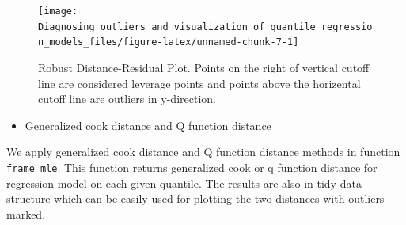 \documentclass[11pt,a4paper,]{article}
\newenvironment{Shaded}{\begin{snugshade}}{\end{snugshade}}
\newcommand{\KeywordTok}[1]{\textcolor[rgb]{0.13,0.29,0.53}{\textbf{{#1}}}}
\newcommand{\DataTypeTok}[1]{\textcolor[rgb]{0.13,0.29,0.53}{{#1}}}
\newcommand{\DecValTok}[1]{\textcolor[rgb]{0.00,0.00,0.81}{{#1}}}
\newcommand{\FloatTok}[1]{\textcolor[rgb]{0.00,0.00,0.81}{{#1}}}
\newcommand{\StringTok}[1]{\textcolor[rgb]{0.31,0.60,0.02}{{#1}}}
\newcommand{\NormalTok}[1]{{#1}}
\providecommand{\tightlist}{%
  \setlength{\itemsep}{0pt}\setlength{\parskip}{0pt}}
\theoremstyle{definition}
\theoremstyle{definition}
\theoremstyle{remark}
\begin{document}
\begin{figure}

{\centering \texttt{[image: Diagnosing\_outliers\_and\_visualization\_of\_quantile\_regression\_models\_files/figure-latex/unnamed-chunk-7-1]} 

}

\caption{Robust Distance-Residual Plot. Points on the right of vertical cutoff line are considered leverage points and points above the horizental cutoff line are outliers in y-direction.}\label{fig:unnamed-chunk-7}
\end{figure}

\begin{itemize}
\tightlist
\item
  Generalized cook distance and Q function distance
\end{itemize}

We apply generalized cook distance and Q function distance methods in
function \texttt{frame\_mle}. This function returns generalized cook or
q function distance for regression model on each given quantile. The
results are also in tidy data structure which can be easily used for
plotting the two distances with outliers marked.

\begin{Shaded}
\end{Shaded}
\end{document}
